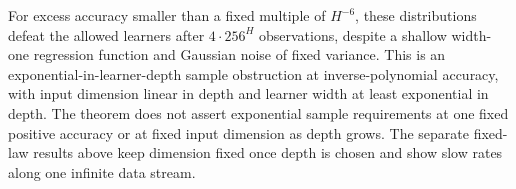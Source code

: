 For excess accuracy smaller than a fixed multiple of $H^{-6}$, these distributions defeat the allowed learners after $4\cdot256^H$ observations, despite a shallow width-one regression function and Gaussian noise of fixed variance. This is an exponential-in-learner-depth sample obstruction at inverse-polynomial accuracy, with input dimension linear in depth and learner width at least exponential in depth. The theorem does not assert exponential sample requirements at one fixed positive accuracy or at fixed input dimension as depth grows. The separate fixed-law results above keep dimension fixed once depth is chosen and show slow rates along one infinite data stream.

